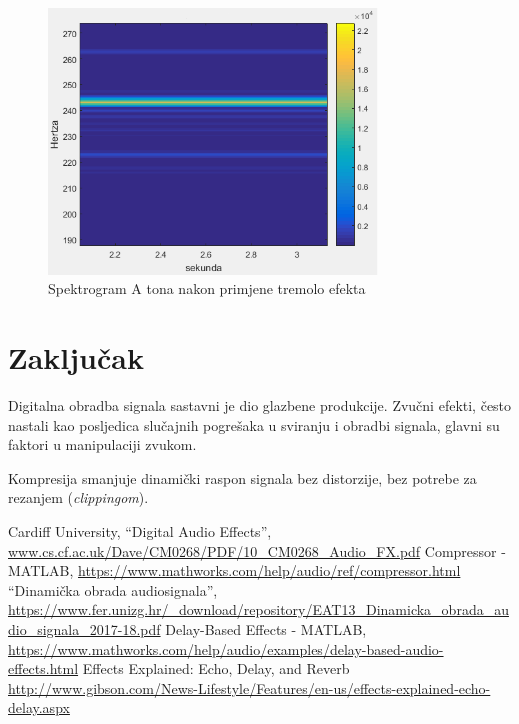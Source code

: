 \documentclass[conference]{IEEEtran}
\begin{document}
 \begin{figure}[H]
   \centerline{\includegraphics[height=200pt]{slike/tremolo_spektar_izlaz.png}}
   \caption{Spektrogram A tona nakon primjene tremolo efekta}
   \label{tremolo_izlaz}
 \end{figure}

\section{Zaključak}
Digitalna obradba signala sastavni je dio glazbene produkcije. Zvučni efekti, često nastali kao
posljedica slučajnih pogrešaka u sviranju i obradbi signala, glavni su faktori u manipulaciji zvukom.

Kompresija smanjuje dinamički raspon signala bez distorzije, bez potrebe za rezanjem
(\textit{clippingom}).

\begin{thebibliography}{00}
 Cardiff University, ``Digital Audio Effects'',
	\url{www.cs.cf.ac.uk/Dave/CM0268/PDF/10_CM0268_Audio_FX.pdf}
   Compressor - MATLAB,
  \url{https://www.mathworks.com/help/audio/ref/compressor.html}
   ``Dinamička obrada audiosignala'',
  \url{https://www.fer.unizg.hr/_download/repository/EAT13_Dinamicka_obrada_audio_signala_2017-18.pdf}
   Delay-Based Effects - MATLAB,
  \url{https://www.mathworks.com/help/audio/examples/delay-based-audio-effects.html}
   Effects Explained: Echo, Delay, and Reverb
  \url{http://www.gibson.com/News-Lifestyle/Features/en-us/effects-explained-echo-delay.aspx}
\end{thebibliography}
\end{document}
